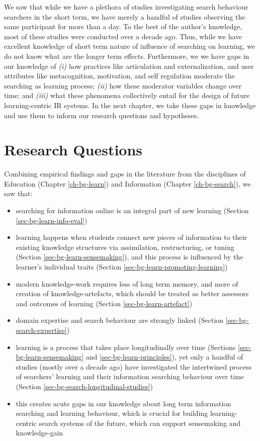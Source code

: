 \documentclass[letterpaper, nobind]{templates/ociamthesis}
\providecommand{\tightlist}{%
  \setlength{\itemsep}{0pt}\setlength{\parskip}{0pt}}
\begin{document}
We saw that while we have a plethora of studies investigating search
behaviour searchers in the short term, we have merely a handful of
studies observing the same participant for more than a day. To the best
of the author's knowledge, most of these studies were conducted over a
decade ago. Thus, while we have excellent knowledge of short term nature
of influence of searching on learning, we do not know what are the
longer term effects. Furthermore, we we have gaps in our knowledge of
\emph{(i)} how practices like articulation and externalization, and user
attributes like metacognition, motivation, and self regulation moderate
the searching as learning process; \emph{(ii)} how these moderator variables
change over time; and \emph{(iii)} what these phenomena collectively entail
for the design of future learning-centric IR systems. In the next
chapter, we take these gaps in knowledge and use them to inform our
research questions and hypotheses.

\hypertarget{ch-rq}{%
\chapter{Research Questions}\label{ch-rq}}

Combining empirical findings and gaps in the literature from the disciplines of Education (Chapter \ref{ch-bg-learn}) and Information (Chapter \ref{ch-bg-search}), we saw that:

\begin{itemize}
\tightlist
\item
  searching for information online is an integral part of new learning (Section \ref{sec-bg-learn-info-eval})
\item
  learning happens when students connect new pieces of information to their existing knowledge structures via assimilation, restructuring, or tuning (Section \ref{sec-bg-learn-sensemaking}), and this process is influenced by the learner's individual traits (Section \ref{sec-bg-learn-promoting-learning})
\item
  modern knowledge-work requires less of long term memory, and more of creation of knowledge-artefacts, which should be treated as better assessors and outcomes of learning (Section \ref{sec-bg-learn-artefact})
\item
  domain expertise and search behaviour are strongly linked (Section \ref{sec-bg-search-expertise})
\item
  learning is a process that takes place longitudinally over time (Sections \ref{sec-bg-learn-sensemaking} and \ref{sec-bg-learn-principles}), yet only a handful of studies (mostly over a decade ago) have investigated the intertwined process of searchers' learning and their information searching behaviour over time (Section \ref{sec-bg-search-longitudinal-studies})
\item
  this creates acute gaps in our knowledge about long term information searching and learning behaviour, which is crucial for building learning-centric search systems of the future, which can support sensemaking and knowledge-gain
\end{itemize}
\end{document}

